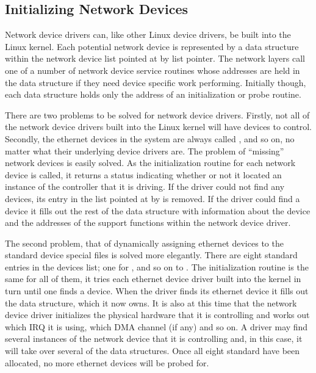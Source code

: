 \subsection{Initializing Network Devices}
Network device drivers can, like other Linux device drivers, be built into the Linux kernel.
Each potential network device is represented by a  data structure within the 
network device list pointed at by  list pointer.
The network layers call one of a number of network device service routines whose addresses
are held in the  data structure if they need device specific work performing.
Initially though, each  data structure holds only the address of an initialization or probe
routine.

There are two problems to be solved for network device drivers.
Firstly, not all of the network device drivers built into the Linux kernel will have devices to control.
Secondly, the ethernet devices in the system are always called ,  and so on, no
matter what their underlying device drivers are.
The problem of ``missing'' network devices is easily solved.
As the initialization routine for each network device is called, it returns a status indicating 
whether or not it located an instance of the controller that it is driving.
If the driver could not find any devices, its entry in the  list pointed at by 
 is removed.
If the driver could find a device it fills out the rest of the  data structure with information
about the device and the addresses of the support functions within the network device driver.

The second problem, that of dynamically assigning ethernet devices to the standard  device
special files is solved more elegantly.
There are eight standard entries in the devices list; one for ,  and so on to
.
The initialization routine is the same for all of them, it tries each ethernet device driver built into
the kernel in turn until one finds a device.
When the driver finds its ethernet device it fills out the   data structure,
 which it now owns.
It is also at this time that the network device driver initializes the physical hardware that it
is controlling and works out which IRQ it is using, which DMA channel (if any) and so on.
A driver may find several instances of the network device that it is controlling and, in this case, it will take
over several of the   data structures.
Once all eight standard  have been allocated, no more ethernet devices will be probed for.


